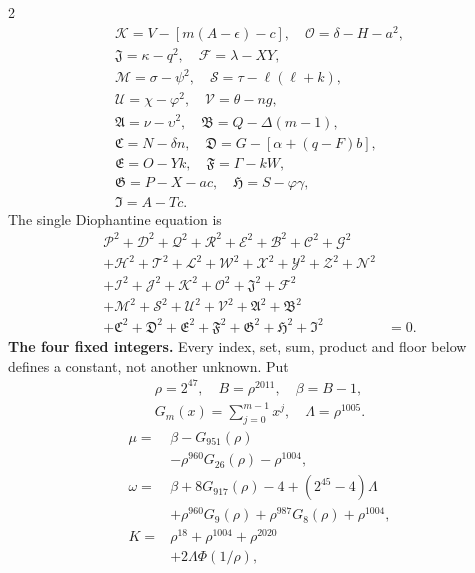 \documentclass[10pt]{article}
\begin{document}
\begin{multicols}{2}
\[\begin{gathered}
\mathcal{K}=V-[m(A-\epsilon)-c],\quad\mathcal{O}=\delta-H-a^2,\\
\mathfrak{J}=\kappa-q^2,\quad\mathcal{F}=\lambda-XY,\\
\mathcal{M}=\sigma-\psi^2,\quad\mathcal{S}=\tau-\ell(\ell+k),\\
\mathcal{U}=\chi-\varphi^2,\quad\mathcal{V}=\theta-ng,\\
\mathfrak{A}=\nu-\upsilon^2,\quad\mathfrak{B}=Q-\Delta(m-1),\\
\mathfrak{C}=N-\delta n,\quad\mathfrak{D}=G-[\alpha+(q-F)b],\\
\mathfrak{E}=O-Yk,\quad\mathfrak{F}=\Gamma-kW,\\
\mathfrak{G}=P-X-ac,\quad\mathfrak{H}=S-\varphi\gamma,\\
\mathfrak{I}=A-Tc.
\end{gathered}
\]
The single Diophantine equation is
\[
\begin{split}
\mathcal{P}^2+\mathcal{D}^2+\mathcal{Q}^2+\mathcal{R}^2+\mathcal{E}^2+\mathcal{B}^2+\mathcal{C}^2+\mathcal{G}^2 &\\
+\mathcal{H}^2+\mathcal{T}^2+\mathcal{L}^2+\mathcal{W}^2+\mathcal{X}^2+\mathcal{Y}^2+\mathcal{Z}^2+\mathcal{N}^2 &\\
+\mathcal{I}^2+\mathcal{J}^2+\mathcal{K}^2+\mathcal{O}^2+\mathfrak{J}^2+\mathcal{F}^2 &\\
+\mathcal{M}^2+\mathcal{S}^2+\mathcal{U}^2+\mathcal{V}^2+\mathfrak{A}^2+\mathfrak{B}^2 &\\
+\mathfrak{C}^2+\mathfrak{D}^2+\mathfrak{E}^2+\mathfrak{F}^2+\mathfrak{G}^2+\mathfrak{H}^2+\mathfrak{I}^2 &= 0.
\end{split}
\]
\textbf{The four fixed integers.}
Every index, set, sum, product and floor below defines a constant, not
another unknown. Put
\[
\begin{gathered}
\rho=2^{47},\quad B=\rho^{2011},\quad\beta=B-1,\\
G_m(x)=\sum_{j=0}^{m-1}x^j,\quad
\Lambda=\rho^{1005}.
\end{gathered}
\]
\begin{align*}
\mu={}&\beta-G_{951}(\rho)\\
&-\rho^{960}G_{26}(\rho)-\rho^{1004},\\
\omega={}&\beta+8G_{917}(\rho)-4+(2^{45}-4)\Lambda\\
&+\rho^{960}G_9(\rho)+\rho^{987}G_8(\rho)
  +\rho^{1004},\\
K={}&\rho^{18}+\rho^{1004}+\rho^{2020}\\
&+2\Lambda\Phi(1/\rho),

\end{align*}
\end{multicols}
\end{document}
